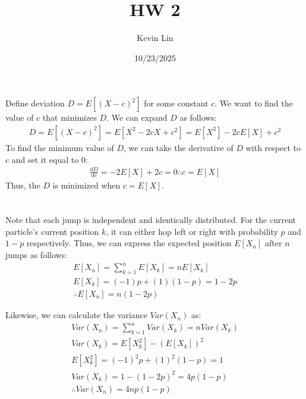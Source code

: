 \documentclass[11pt,a4paper,margin=1in]{article}
\title{HW 2}
\author{Kevin Lin}
\date{10/23/2025}
\begin{document}
\maketitle
\section{}
    Define deviation $D = E[(X - c)^2]$ for some constant $c$. We want to find
    the value of $c$ that minimizes $D$. We can expand $D$ as follows:
    \begin{gather*}
        D = E[(X - c)^2] = E[X^2 - 2cX + c^2] = E[X^2] - 2cE[X] + c^2
    \end{gather*}
    To find the minimum value of $D$, we can take the derivative of $D$
    with respect to $c$ and set it equal to 0:
    \begin{gather*}
        \frac{dD}{dc} = -2E[X] + 2c = 0 \therefore c = E[X]
    \end{gather*}
    Thus, the $D$ is minimized when $c = E[X]$.

\section{}
    Note that each jump is independent and identically distributed. For the current
    particle's current position $k$, it can either hop left or right with probability
    $p$ and $1 - p$ respectively. Thus, we can express the expected position $E[X_n]$
    after $n$ jumps as follows:
    \begin{gather*}
        E[X_n] = \sum_{k=1}^n E[X_k] = nE[X_k] \\
        E[X_k] = (-1)p + (1)(1 - p) = 1 - 2p \\
        \therefore E[X_n] = n(1 - 2p)
    \end{gather*}

    Likewise, we can calculate the variance $Var(X_n)$ as:
    \begin{gather*}
        Var(X_n) = \sum_{k=1}^n Var(X_k) = nVar(X_k) \\
        Var(X_k) = E[X_k^2] - (E[X_k])^2 \\ 
        E[X_k^2] = (-1)^2p + (1)^2(1 - p) = 1 \\
        Var(X_k) = 1 - (1 - 2p)^2 = 4p(1 - p) \\
        \therefore Var(X_n) = 4np(1 - p)
    \end{gather*}
    
\end{document}
